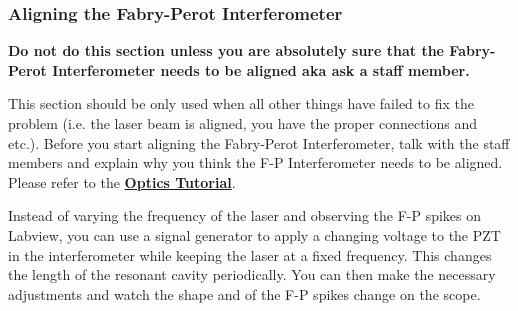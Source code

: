 \documentclass{../lab}
\begin{document}
\begin{enumerate}

\end{enumerate}

\subsubsection{Aligning the Fabry-Perot Interferometer}

\textbf{Do not do this section unless you are absolutely sure that the Fabry-Perot Interferometer needs to be aligned aka ask a staff member.}

This section should be only used when all other things have failed to fix the problem (i.e. the laser beam is aligned, you have the proper connections and etc.). Before you start aligning the Fabry-Perot Interferometer, talk with the staff members and explain why you think the F-P Interferometer needs to be aligned. Please refer to the \href{https://berkeley-physics111b.github.io/appendices/OpticsTutorial/}{\textbf{Optics Tutorial}}.

Instead of varying the frequency of the laser and observing the F-P spikes on Labview, you can use a signal generator to apply a changing voltage to the PZT in the interferometer while keeping the laser at a fixed frequency. This changes the length of the resonant cavity periodically. You can then make the necessary adjustments and watch the shape and of the F-P spikes change on the scope.

\newpage
\end{document}
